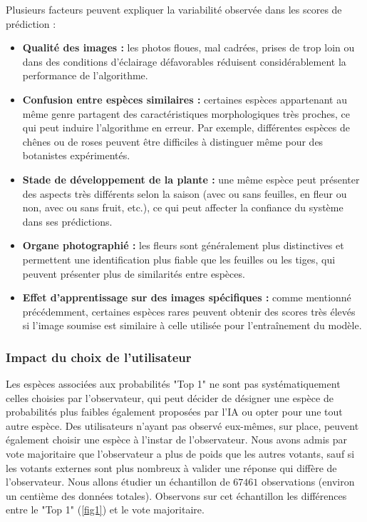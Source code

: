 \documentclass[a4paper,12pt]{article}
\begin{document}
Plusieurs facteurs peuvent expliquer la variabilité observée dans les scores de prédiction : 
\begin{itemize}
    \item \textbf{Qualité des images :} les photos floues, mal cadrées, prises de trop loin ou dans des conditions d'éclairage défavorables réduisent considérablement la performance de l'algorithme.
    \item \textbf{Confusion entre espèces similaires :} certaines espèces appartenant au même genre partagent des caractéristiques morphologiques très proches, ce qui peut induire l'algorithme en erreur. Par exemple, différentes espèces de chênes ou de roses peuvent être difficiles à distinguer même pour des botanistes expérimentés.
    \item \textbf{Stade de développement de la plante :} une même espèce peut présenter des aspects très différents selon la saison (avec ou sans feuilles, en fleur ou non, avec ou sans fruit, etc.), ce qui peut affecter la confiance du système dans ses prédictions.
    \item \textbf{Organe photographié :} les fleurs sont généralement plus distinctives et permettent une identification plus fiable que les feuilles ou les tiges, qui peuvent présenter plus de similarités entre espèces.
    \item \textbf{Effet d'apprentissage sur des images spécifiques :} comme mentionné précédemment, certaines espèces rares peuvent obtenir des scores très élevés si l'image soumise est similaire à celle utilisée pour l'entraînement du modèle.
\end{itemize}

\subsubsection{Impact du choix de l'utilisateur}

Les espèces associées aux probabilités "Top 1" ne sont pas systématiquement celles choisies par l'observateur, qui peut décider de désigner une espèce de probabilités plus faibles également proposées par l'IA ou opter pour une tout autre espèce. Des utilisateurs n'ayant pas observé eux-mêmes, sur place, peuvent également choisir une espèce à l'instar de l'observateur. Nous avons admis par vote majoritaire que l'observateur a plus de poids que les autres votants, sauf si les votants externes sont plus nombreux à valider une réponse qui diffère de l'observateur. Nous allons étudier un échantillon de $67 461$ observations (environ un centième des données totales). Observons sur cet échantillon les différences entre le "Top 1" (\ref{fig1}) et le vote majoritaire.
\end{document}
